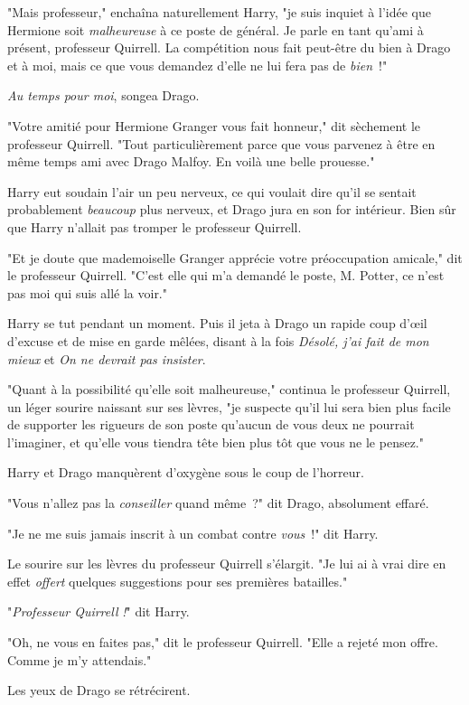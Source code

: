 "Mais professeur," enchaîna naturellement Harry, "je suis inquiet à l'idée que Hermione soit \emph{malheureuse} à ce poste de général. Je parle en tant qu'ami à présent, professeur Quirrell. La compétition nous fait peut-être du bien à Drago et à moi, mais ce que vous demandez d'elle ne lui fera pas de \emph{bien}~!"

\emph{Au temps pour moi}, songea Drago.

"Votre amitié pour Hermione Granger vous fait honneur," dit sèchement le professeur Quirrell. "Tout particulièrement parce que vous parvenez à être en même temps ami avec Drago Malfoy. En voilà une belle prouesse."

Harry eut soudain l'air un peu nerveux, ce qui voulait dire qu'il se sentait probablement \emph{beaucoup} plus nerveux, et Drago jura en son for intérieur. Bien sûr que Harry n'allait pas tromper le professeur Quirrell.

"Et je doute que mademoiselle Granger apprécie votre préoccupation amicale," dit le professeur Quirrell. "C'est elle qui m'a demandé le poste, M. Potter, ce n'est pas moi qui suis allé la voir."

Harry se tut pendant un moment. Puis il jeta à Drago un rapide coup d'œil d'excuse et de mise en garde mêlées, disant à la fois \emph{Désolé, j'ai fait de mon mieux} et \emph{On ne devrait pas insister}.

"Quant à la possibilité qu'elle soit malheureuse," continua le professeur Quirrell, un léger sourire naissant sur ses lèvres, "je suspecte qu'il lui sera bien plus facile de supporter les rigueurs de son poste qu'aucun de vous deux ne pourrait l'imaginer, et qu'elle vous tiendra tête bien plus tôt que vous ne le pensez."

Harry et Drago manquèrent d'oxygène sous le coup de l'horreur.

"Vous n'allez pas la \emph{conseiller} quand même~?" dit Drago, absolument effaré.

"Je ne me suis jamais inscrit à un combat contre \emph{vous}~!" dit Harry.

Le sourire sur les lèvres du professeur Quirrell s'élargit. "Je lui ai à vrai dire en effet \emph{offert} quelques suggestions pour ses premières batailles."

"\emph{Professeur Quirrell} \emph{!}" dit Harry.

"Oh, ne vous en faites pas," dit le professeur Quirrell. "Elle a rejeté mon offre. Comme je m'y attendais."

Les yeux de Drago se rétrécirent.

